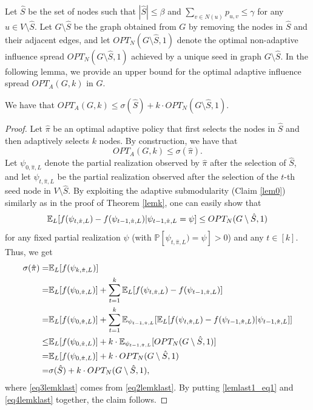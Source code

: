 Let $\hat{S}$ be the set of nodes such that $|\hat{S}|\leq \beta$ and $\sum_{v\in N(u)}p_{u,v}\leq \gamma$ for any $u\in V\setminus \hat{S}$. Let $G\setminus \hat{S}$ be the graph obtained from $G$ by removing the nodes in $\hat{S}$ and their adjacent edges, and let $OPT_N(G\setminus \hat{S},1)$ denote the optimal non-adaptive influence spread $OPT_N(G\setminus \hat{S},1)$ achieved by a unique seed in graph $G\setminus \hat{S}$. In the following lemma, we provide an upper bound for the optimal adaptive influence spread $OPT_A(G,k)$ in $G$.
\begin{lemma}\label{lemlast1}
We have that $OPT_A(G,k)\leq \sigma(\hat{S})+k\cdot OPT_N(G\setminus \hat{S},1).$
\end{lemma}
\begin{proof}
Let $\hat{\pi}$ be an optimal adaptive policy that first selects the nodes in $\hat{S}$ and then adaptively selects $k$ nodes. By construction, we have that 
\begin{equation}\label{lemlast1_eq1}
OPT_A(G,k)\leq \sigma(\hat{\pi}).
\end{equation}
Let $\psi_{0,\hat{\pi},L}$ denote the partial realization observed by $\hat{\pi}$ after the selection of $\hat{S}$, and let $\psi_{t,\hat{\pi},L}$ be the partial realization observed after the selection of the $t$-th seed node in $V\setminus \hat{S}$. By exploiting the adaptive submodularity (Claim  \ref{lem0}) similarly as in the proof of Theorem \ref{lemk}, one can easily show that 
\begin{equation}\label{eq2lemklast}
\mathbb{E}_{L}[f(\psi_{t,\hat{\pi},L})-f(\psi_{t-1,\hat{\pi},L})|\psi_{t-1,\hat{\pi},L}=\psi]\leq OPT_N(G\setminus \hat{S},1)
\end{equation}
for any fixed partial realization $\psi$ (with $\mathbb{P}[\psi_{t,\hat{\pi},L})=\psi]>0$) and any $t\in [k]$. Thus, we get
\begin{align}
\sigma(\hat{\pi})=&\mathbb{E}_{L}[f(\psi_{k,\hat{\pi},L})]\nonumber\\
=&\mathbb{E}_{L}[f(\psi_{0,\hat{\pi},L})]+\sum_{t=1}^k \mathbb{E}_{L}[f(\psi_{t,\hat{\pi},L})-f(\psi_{t-1,\hat{\pi},L})]\nonumber\\
=&\mathbb{E}_{L}[f(\psi_{0,\hat{\pi},L})]+\sum_{t=1}^k \mathbb{E}_{\psi_{t-1,\hat{\pi},L}}[\mathbb{E}_L[f(\psi_{t,\hat{\pi},L})-f(\psi_{t-1,\hat{\pi},L})|\psi_{t-1,\hat{\pi},L}]]\nonumber\\
\leq &\mathbb{E}_{L}[f(\psi_{0,\hat{\pi},L})]+k\cdot\mathbb{E}_{\psi_{t-1,\hat{\pi},L}}[OPT_N(G\setminus \hat{S},1)]\label{eq3lemklast}\\
=&\mathbb{E}_{L}[f(\psi_{0,\hat{\pi},L})]+k\cdot OPT_N(G\setminus \hat{S},1)\nonumber\\
= &\sigma(\hat{S})+k\cdot OPT_N(G\setminus \hat{S},1),\label{eq4lemklast}
\end{align}
where \eqref{eq3lemklast} comes from \eqref{eq2lemklast}. By putting \eqref{lemlast1_eq1} and \eqref{eq4lemklast} together, the claim follows.
\end{proof}
